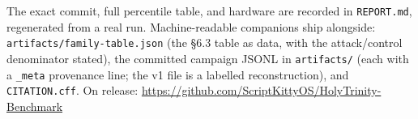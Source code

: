 \documentclass[11pt]{article}
\begin{document}
The exact commit, full percentile table, and hardware are recorded in \texttt{REPORT.md}, regenerated
from a real run. Machine-readable companions ship alongside: \texttt{artifacts/family-table.json}
(the \S6.3 table as data, with the attack/control denominator stated), the committed campaign
JSONL in \texttt{artifacts/} (each with a \texttt{\_meta} provenance line; the v1 file is a labelled
reconstruction), and \texttt{CITATION.cff}. On release:
\url{https://github.com/ScriptKittyOS/HolyTrinity-Benchmark}
\end{document}
